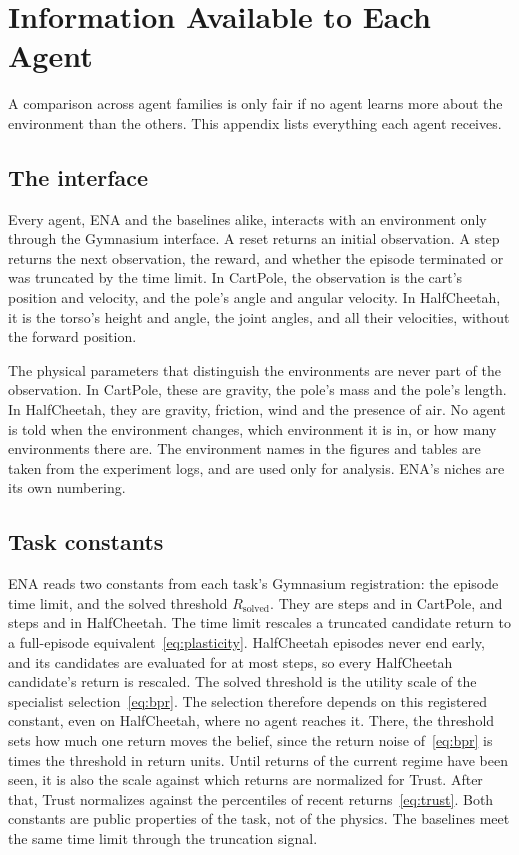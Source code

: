 \section{Information Available to Each Agent}
\label{app:information}
A comparison across agent families is only fair if no agent learns more about the environment than the others. This appendix lists everything each agent receives.

\subsection{The interface}
Every agent, ENA and the baselines alike, interacts with an environment only through the Gymnasium interface. A reset returns an initial observation. A step returns the next observation, the reward, and whether the episode terminated or was truncated by the time limit. In CartPole, the observation is the cart's position and velocity, and the pole's angle and angular velocity. In HalfCheetah, it is the torso's height and angle, the joint angles, and all their velocities, without the forward position.

The physical parameters that distinguish the environments are never part of the observation. In CartPole, these are gravity, the pole's mass and the pole's length. In HalfCheetah, they are gravity, friction, wind and the presence of air. No agent is told when the environment changes, which environment it is in, or how many environments there are. The environment names in the figures and tables are taken from the experiment logs, and are used only for analysis. ENA's niches are its own numbering.

\subsection{Task constants}
ENA reads two constants from each task's Gymnasium registration: the episode time limit, and the solved threshold $R_{\text{solved}}$. They are  steps and  in CartPole, and  steps and  in HalfCheetah. The time limit rescales a truncated candidate return to a full-episode equivalent~\eqref{eq:plasticity}. HalfCheetah episodes never end early, and its candidates are evaluated for at most  steps, so every HalfCheetah candidate's return is rescaled. The solved threshold is the utility scale of the specialist selection~\eqref{eq:bpr}. The selection therefore depends on this registered constant, even on HalfCheetah, where no agent reaches it. There, the threshold sets how much one return moves the belief, since the return noise of~\eqref{eq:bpr} is  times the threshold in return units. Until  returns of the current regime have been seen, it is also the scale against which returns are normalized for Trust. After that, Trust normalizes against the percentiles of recent returns~\eqref{eq:trust}. Both constants are public properties of the task, not of the physics. The baselines meet the same time limit through the truncation signal.

